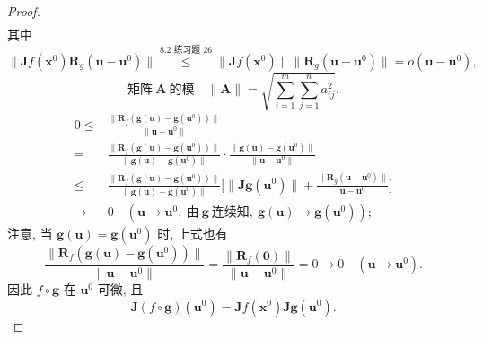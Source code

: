 \begin{proof}
\begin{align*}
\end{align*}
其中
\[
  \|\boldsymbol{J}f(\boldsymbol{x}^{0})\boldsymbol{R}_{g}(\boldsymbol{u} - \boldsymbol{u}^{0})\| \overset{\text{8.2 练习题 26}}{\leqslant} \|\boldsymbol{J}f(\boldsymbol{x}^{0})\|\|\boldsymbol{R}_{g}(\boldsymbol{u} - \boldsymbol{u}^{0})\| = o(\boldsymbol{u} - \boldsymbol{u}^{0}),
\]
\[
  \text{矩阵}\ \boldsymbol{A}\ \text{的模}\quad \|\boldsymbol{A}\| = \sqrt{\sum_{i=1}^{m}\sum_{j=1}^{n}a_{ij}^{2}}.
\]
\begin{align*}
  0 \leqslant {}& \frac{\|\boldsymbol{R}_{f}(\boldsymbol{g}(\boldsymbol{u}) - \boldsymbol{g}(\boldsymbol{u}^{0}))\|}{\|\boldsymbol{u} - \boldsymbol{u}^{0}\|} \\
  = {}& \frac{\|\boldsymbol{R}_{f}(\boldsymbol{g}(\boldsymbol{u}) - \boldsymbol{g}(\boldsymbol{u}^{0}))\|}{\|\boldsymbol{g}(\boldsymbol{u}) - \boldsymbol{g}(\boldsymbol{u}^{0})\|} \cdot \frac{\|\boldsymbol{g}(\boldsymbol{u}) - \boldsymbol{g}(\boldsymbol{u}^{0})\|}{\|\boldsymbol{u} - \boldsymbol{u}^{0}\|} \\
  \leqslant {}& \frac{\|\boldsymbol{R}_{f}(\boldsymbol{g}(\boldsymbol{u}) - \boldsymbol{g}(\boldsymbol{u}^{0}))\|}{\|\boldsymbol{g}(\boldsymbol{u}) - \boldsymbol{g}(\boldsymbol{u}^{0})\|}\Big[\|\boldsymbol{J}\boldsymbol{g}(\boldsymbol{u}^{0})\| + \frac{\|\boldsymbol{R}_{g}(\boldsymbol{u} - \boldsymbol{u}^{0})\|}{\boldsymbol{u} - \boldsymbol{u}^{0}}\Big] \\
  \to {}& 0 \quad (\boldsymbol{u} \to \boldsymbol{u}^{0},\ \text{由}\ \boldsymbol{g}\ \text{连续知},\ \boldsymbol{g}(\boldsymbol{u}) \to \boldsymbol{g}(\boldsymbol{u}^{0}));
\end{align*}
注意, 当 $\boldsymbol{g}(\boldsymbol{u}) = \boldsymbol{g}(\boldsymbol{u}^{0})$ 时, 上式也有
\[
  \frac{\|\boldsymbol{R}_{f}(\boldsymbol{g}(\boldsymbol{u}) - \boldsymbol{g}(\boldsymbol{u}^{0}))\|}{\|\boldsymbol{u} - \boldsymbol{u}^{0}\|} = \frac{\|\boldsymbol{R}_{f}(\boldsymbol{0})\|}{\|\boldsymbol{u} - \boldsymbol{u}^{0}\|} = 0 \to 0 \quad (\boldsymbol{u} \to \boldsymbol{u}^{0}).
\]
因此 $f \circ \boldsymbol{g}$ 在 $\boldsymbol{u}^{0}$ 可微, 且
\[
  \boldsymbol{J}(f \circ \boldsymbol{g})(\boldsymbol{u}^{0}) = \boldsymbol{J}f(\boldsymbol{x}^{0})\boldsymbol{J}\boldsymbol{g}(\boldsymbol{u}^{0}).
\]
\end{proof}

